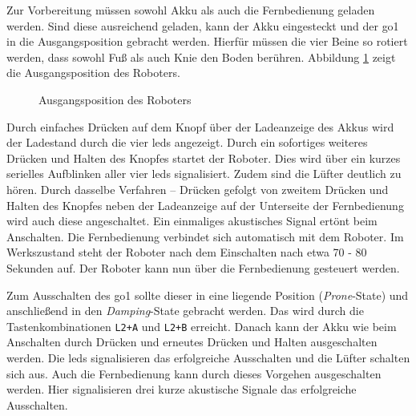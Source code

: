 \noindent Zur Vorbereitung müssen sowohl Akku als auch die Fernbedienung geladen werden.
Sind diese ausreichend geladen, kann der Akku eingesteckt und der \gls{go1} in die Ausgangsposition gebracht werden.
Hierfür müssen die vier Beine so rotiert werden, dass sowohl Fuß als auch Knie den Boden berühren.
Abbildung \ref{fig:ausgangsposition} zeigt die Ausgangsposition des Roboters.

\begin{figure}[h]
    \caption{Ausgangsposition des Roboters}\label{fig:ausgangsposition}
\end{figure}

Durch einfaches Drücken auf dem Knopf über der Ladeanzeige des Akkus wird der Ladestand durch die vier \glspl{led}
angezeigt.
Durch ein sofortiges weiteres Drücken und Halten des Knopfes startet der Roboter.
Dies wird über ein kurzes serielles Aufblinken aller vier \glspl{led} signalisiert.
Zudem sind die Lüfter deutlich zu hören.
Durch dasselbe Verfahren -- Drücken gefolgt von zweitem Drücken und Halten des Knopfes neben der Ladeanzeige auf
der Unterseite der Fernbedienung wird auch diese angeschaltet.
Ein einmaliges akustisches Signal ertönt beim Anschalten.
Die Fernbedienung verbindet sich automatisch mit dem Roboter.
Im Werkszustand steht der Roboter nach dem Einschalten nach etwa \num{70} - \num{80} Sekunden auf.
Der Roboter kann nun über die Fernbedienung gesteuert werden.

Zum Ausschalten des \gls{go1} sollte dieser in eine liegende Position (\emph{Prone}-State) und anschließend in den \emph{Damping}-State gebracht werden.
Das wird durch die Tastenkombinationen \texttt{L2+A} und \texttt{L2+B} erreicht.
Danach kann der Akku wie beim Anschalten durch Drücken und erneutes Drücken und Halten ausgeschalten werden.
Die \glspl{led} signalisieren das erfolgreiche Ausschalten und die Lüfter schalten sich aus.
Auch die Fernbedienung kann durch dieses Vorgehen ausgeschalten werden.
Hier signalisieren drei kurze akustische Signale das erfolgreiche Ausschalten.

